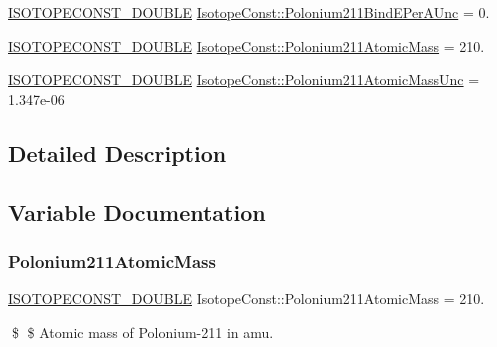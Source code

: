 \begin{DoxyCompactItemize}
\mbox{\hyperlink{group___isotope_const-_macros_ga8f45a7272ce02c0b4c65c44636ed719a}{I\+S\+O\+T\+O\+P\+E\+C\+O\+N\+S\+T\+\_\+\+D\+O\+U\+B\+LE}} \mbox{\hyperlink{group___isotope_const-_polonium-_po211_gaec853f2aa63f9cb19bfeca63b33c9824}{Isotope\+Const\+::\+Polonium211\+Bind\+E\+Per\+A\+Unc}} = 0.
\item 
\mbox{\hyperlink{group___isotope_const-_macros_ga8f45a7272ce02c0b4c65c44636ed719a}{I\+S\+O\+T\+O\+P\+E\+C\+O\+N\+S\+T\+\_\+\+D\+O\+U\+B\+LE}} \mbox{\hyperlink{group___isotope_const-_polonium-_po211_ga42ed109c5a09ee6624ecd4cef191c19d}{Isotope\+Const\+::\+Polonium211\+Atomic\+Mass}} = 210.
\item 
\mbox{\hyperlink{group___isotope_const-_macros_ga8f45a7272ce02c0b4c65c44636ed719a}{I\+S\+O\+T\+O\+P\+E\+C\+O\+N\+S\+T\+\_\+\+D\+O\+U\+B\+LE}} \mbox{\hyperlink{group___isotope_const-_polonium-_po211_ga8b9b085babd7217e093dbb40dc5c4fb0}{Isotope\+Const\+::\+Polonium211\+Atomic\+Mass\+Unc}} = 1.\+347e-\/06
\end{DoxyCompactItemize}


\subsection{Detailed Description}


\subsection{Variable Documentation}
\mbox{\label{group___isotope_const-_polonium-_po211_ga42ed109c5a09ee6624ecd4cef191c19d}} 
\subsubsection{\texorpdfstring{Polonium211\+Atomic\+Mass}{Polonium211AtomicMass}}
{\footnotesize\ttfamily \mbox{\hyperlink{group___isotope_const-_macros_ga8f45a7272ce02c0b4c65c44636ed719a}{I\+S\+O\+T\+O\+P\+E\+C\+O\+N\+S\+T\+\_\+\+D\+O\+U\+B\+LE}} Isotope\+Const\+::\+Polonium211\+Atomic\+Mass = 210.}

\$ \$ Atomic mass of Polonium-\/211 in amu. \mbox{\label{group___isotope_const-_polonium-_po211_ga8b9b085babd7217e093dbb40dc5c4fb0}} 

